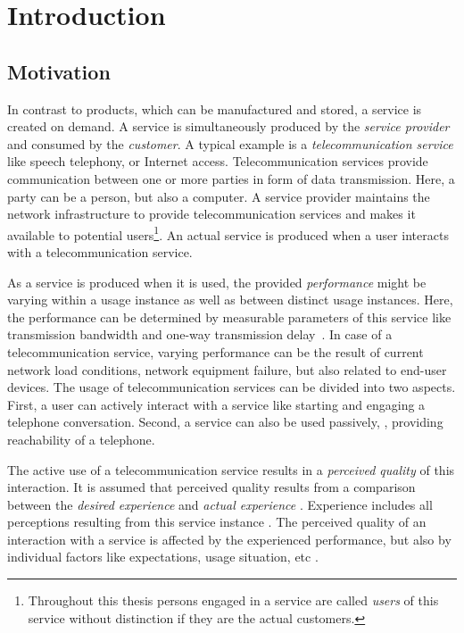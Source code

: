 \chapter{Introduction}\label{chap:01}

\section{Motivation}
In contrast to products, which can be manufactured and stored, a service is created on demand.
A service is simultaneously produced by the \emph{service provider} and consumed by the \emph{customer}.
A typical example is a \emph{telecommunication service} like speech telephony, or Internet access.
Telecommunication services provide communication between one or more parties in form of data transmission.
Here, a party can be a person, but also a computer.
A service provider maintains the network infrastructure to provide telecommunication services and makes it available to potential users\footnote{Throughout this thesis persons engaged in a service are called \emph{users} of this service without distinction if they are the actual customers.}.
An actual service is produced when a user interacts with a telecommunication service.

As a service is produced when it is used, the provided \emph{performance} might be varying within a usage instance as well as between distinct usage instances.
Here, the performance can be determined by measurable parameters of this service like transmission bandwidth and one-way transmission delay~\citep[][p.~12]{moller_assessment_2000}.
In case of a telecommunication service, varying performance can be the result of current network load conditions, network equipment failure, but also related to end-user devices.
The usage of telecommunication services can be divided into two aspects.
First, a user can actively interact with a service like starting and engaging a telephone conversation.
Second, a service can also be used passively, \eg, providing reachability of a telephone.

The active use of a telecommunication service results in a \emph{perceived quality} of this interaction.
It is assumed that perceived quality results from a comparison between the \emph{desired experience} and \emph{actual experience} \citep[][p.~13]{raake_quality_2014}. %
Experience includes all perceptions resulting from this service instance \citep[][p.~13]{raake_quality_2014}.
The perceived quality of an interaction with a service is affected by the experienced performance, but also by individual factors like expectations, usage situation, etc \citep[\eg,][p.~55ff.]{reiter_factors_2014}.

